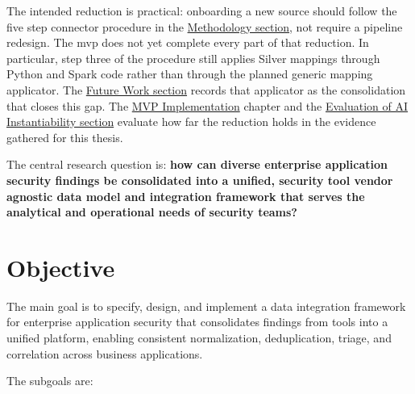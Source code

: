 The intended reduction is practical: onboarding a new source should follow the five step connector procedure in the \hyperref[sec:impl-methodology]{Methodology section}, not require a pipeline redesign. The \gls{mvp} does not yet complete every part of that reduction. In particular, step three of the procedure still applies Silver mappings through Python and Spark code rather than through the planned generic mapping applicator. The \hyperref[sec:future-work]{Future Work section} records that applicator as the consolidation that closes this gap. The \hyperref[ch:implementation]{MVP Implementation} chapter and the \hyperref[sec:ai-eval]{Evaluation of AI Instantiability section} evaluate how far the reduction holds in the evidence gathered for this thesis.

The central research question is: \textbf{how can diverse enterprise application security findings be consolidated into a unified, security tool vendor agnostic data model and integration framework that serves the analytical and operational needs of security teams?}

\section*{Objective}

The main goal is to specify, design, and implement a data integration framework for enterprise application security that consolidates findings from tools into a unified platform, enabling consistent normalization, deduplication, triage, and correlation across business applications.

The subgoals are:


